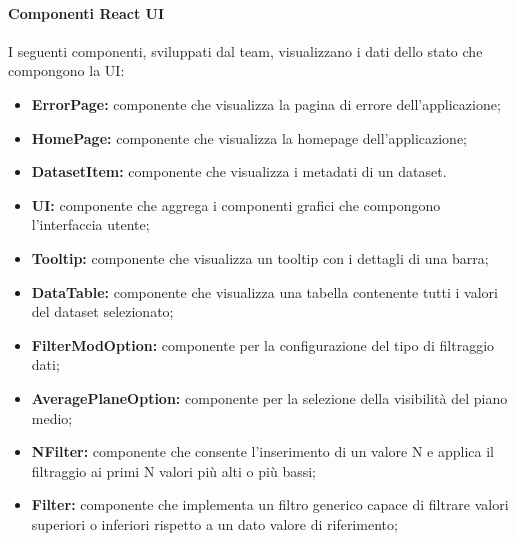 \paragraph{Componenti React UI}
I seguenti componenti, sviluppati dal team, visualizzano i dati dello stato che
compongono la UI:
\begin{itemize}
    \item \textbf{ErrorPage:} componente che visualizza la pagina di errore dell'applicazione;
    \item \textbf{HomePage:} componente che visualizza la homepage dell'applicazione;
    \item \textbf{DatasetItem:} componente che visualizza i metadati di un dataset.
    \item \textbf{UI:} componente che aggrega i componenti grafici che compongono l'interfaccia utente;
    \item \textbf{Tooltip:} componente che visualizza un tooltip con i dettagli di una barra;
    \item \textbf{DataTable:} componente che visualizza una tabella contenente tutti i valori del dataset selezionato;
    \item \textbf{FilterModOption:} componente per la configurazione del tipo di filtraggio dati;
    \item \textbf{AveragePlaneOption:} componente per la selezione della visibilità del piano medio;
    \item \textbf{NFilter:} componente che consente l'inserimento di un valore N e applica il filtraggio ai primi N valori più alti o più bassi;
    \item \textbf{Filter:} componente che implementa un filtro generico capace di filtrare valori superiori o inferiori rispetto a un dato valore di riferimento;
\end{itemize}
